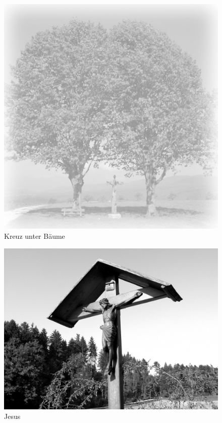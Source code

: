 \documentclass[ngerman,a4paper,11pt]{scrreprt}
\begin{document}
\begin{figure}[H]
\centering
\includegraphics[width=\textwidth,height=.8\textheight]{Bilder/Bilder/750_0010_18433_1161980_Hintergrund_Baeume_und_Kreuz.png}
\caption{Kreuz unter Bäume}
\end{figure}

\begin{figure}[H]
\centering
\includegraphics[width=\textwidth,height=.8\textheight]{Bilder/Bilder/750_0010_25344_Jesus_am_Holzkreuz.png}
\caption{Jesus}
\end{figure}
\end{document}
